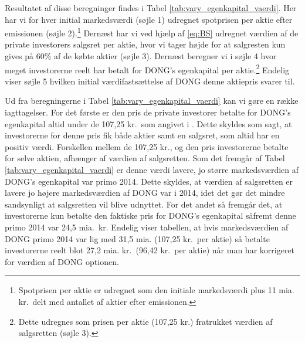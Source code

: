 \documentclass{article}
\begin{document}
Resultatet af disse beregninger findes i Tabel \ref{tab:vary_egenkapital_vaerdi}. Her har vi for hver initial markedsværdi (søjle 1) udregnet spotprisen per aktie efter emissionen (søjle 2).\footnote{Spotprisen per aktie er udregnet som den initiale markedsværdi plus 11 mia. kr.\ delt med antallet af aktier efter emissionen.} Dernæst har vi ved hjælp af \eqref{eq:BS} udregnet værdien af de private investorers salgsret per aktie, hvor vi tager højde for at salgresten kun gives på 60\% af de købte aktier (søjle 3). Dernæst  beregner vi i søjle 4 hvor meget investorerne reelt har betalt for DONG's egenkapital per aktie.\footnote{Dette udregnes som prisen per aktie (107,25 kr.) fratrukket værdien af salgsretten (søjle 3).} Endelig viser søjle 5 hvilken initial værdifastsættelse af DONG denne aktiepris svarer til. 
 
Ud fra beregningerne i Tabel \ref{tab:vary_egenkapital_vaerdi} kan vi gøre en række iagttagelser. For det første er den pris de private investorer betalte for DONG's egenkapital altid under de 107,25 kr.\ som angivet i \citep{FM2013a}. Dette skyldes som sagt, at investorerne for denne pris fik både aktier samt en salgsret, som altid har en positiv værdi. Forskellen mellem de 107,25 kr., og den pris investorerne betalte for selve aktien, afhænger af værdien af salgsretten. Som det fremgår af Tabel \ref{tab:vary_egenkapital_vaerdi} er denne værdi lavere, jo større markedsværdien af DONG's egenkapital var primo 2014. Dette skyldes, at værdien af salgsretten er lavere jo højere markedsværdien af DONG var i 2014, idet det gør det mindre sandsynligt at salgsretten vil blive udnyttet. For det andet så fremgår det, at investorerne kun betalte den faktiske pris for DONG's egenkapital såfremt denne primo 2014 var 24,5 mia.\ kr. Endelig viser tabellen, at hvis markedsværdien af DONG primo 2014 var lig med 31,5 mia. (107,25 kr.\ per aktie) så betalte investorerne reelt blot 27,2 mia. kr.\ (96,42 kr.\ per aktie) når man har korrigeret for værdien af DONG optionen.
\end{document}
